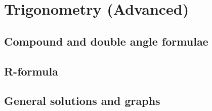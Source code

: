 
\section{Trigonometry (Advanced)}

\subsection{Compound and double angle formulae}


\subsection{R-formula}


\subsection{General solutions and graphs}

